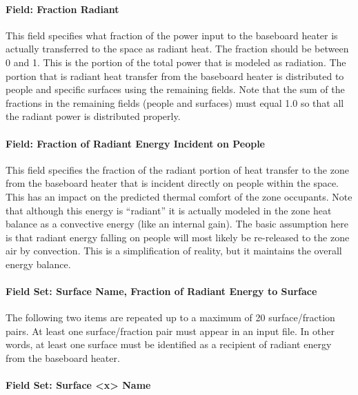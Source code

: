 \paragraph{Field: Fraction Radiant}\label{field-fraction-radiant-2-000}

This field specifies what fraction of the power input to the baseboard heater is actually transferred to the space as radiant heat. The fraction should be between 0 and 1. This is the portion of the total power that is modeled as radiation. The portion that is radiant heat transfer from the baseboard heater is distributed to people and specific surfaces using the remaining fields. Note that the sum of the fractions in the remaining fields (people and surfaces) must equal 1.0 so that all the radiant power is distributed properly.

\paragraph{Field: Fraction of Radiant Energy Incident on People}\label{field-fraction-of-radiant-energy-incident-on-people-2}

This field specifies the fraction of the radiant portion of heat transfer to the zone from the baseboard heater that is incident directly on people within the space. This has an impact on the predicted thermal comfort of the zone occupants. Note that although this energy is ``radiant'' it is actually modeled in the zone heat balance as a convective energy (like an internal gain). The basic assumption here is that radiant energy falling on people will most likely be re-released to the zone air by convection. This is a simplification of reality, but it maintains the overall energy balance.

\paragraph{Field Set: Surface Name, Fraction of Radiant Energy to Surface}\label{field-set-surface-name-fraction-of-radiant-energy-to-surface-2}

The following two items are repeated up to a maximum of 20 surface/fraction pairs. At least one surface/fraction pair must appear in an input file. In other words, at least one surface must be identified as a recipient of radiant energy from the baseboard heater.

\paragraph{Field Set: Surface \textless{}x\textgreater{} Name}\label{field-set-surface-x-name}

